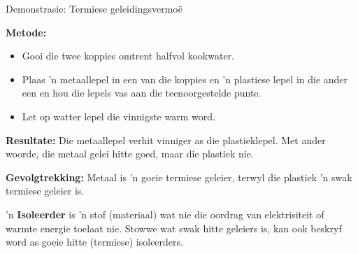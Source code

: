 \begin{g_experiment}{Demonstrasie: Termiese geleidingsvermo\"e}
{\begin{minipage}{.5\textwidth}
\end{minipage}
      \label{m38706*id66592}\textbf{Metode:}
\label{m38706*id66609}\begin{itemize}[noitemsep]
\label{m38706*uid102}\item Gooi die twee koppies omtrent halfvol kookwater.
\label{m38706*uid103}\item Plaas 'n metaallepel in een van die koppies en 'n plastiese lepel in die ander een en hou die lepels vas aan die teenoorgestelde punte.
\label{m38706*uid104}\item Let op watter lepel die vinnigste warm word.
\end{itemize}
        \par 
\label{m38706*eip-270}
	\par
      \label{m38706*id66666}\noindent{}\textbf{Resultate: }\newline
     Die metaallepel verhit vinniger as die plastieklepel. Met ander woorde, die metaal gelei hitte goed, maar die plastiek nie.\par 
\label{m38706*id66687}\noindent{}\textbf{Gevolgtrekking: }Metaal is 'n goeie termiese geleier, terwyl die plastiek 'n swak termiese geleier is.}
\end{g_experiment}
 \par 
      \label{m38706*id66699}'n \textbf{Isoleerder} is 'n stof (materiaal) wat nie die oordrag van elektrisiteit of warmte energie toelaat nie. Stowwe wat swak hitte geleiers is, kan ook beskryf word as goeie hitte (termiese) isoleerders.\par 
